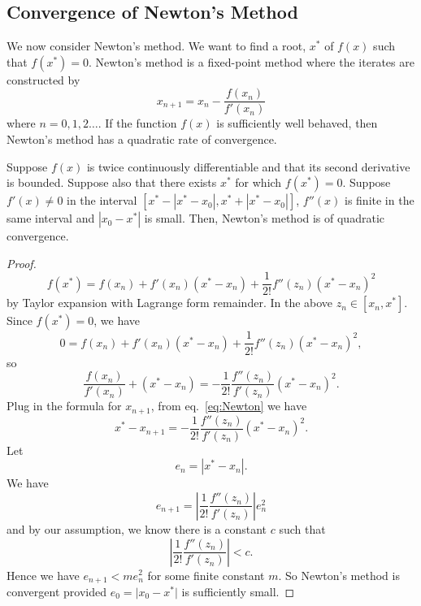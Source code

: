\subsection{Convergence of Newton's Method}

We now consider Newton's method. We want to find a root, $x^*$ of $f(x)$ such that $f(x^*)=0.$ Newton's method is a fixed-point method where the iterates are constructed by
\begin{equation}\label{eq:Newton}
x_{n+1}=x_{n}-\frac{f(x_{n})}{f'(x_{n})}
\end{equation}
where $n=0,1,2\ldots$. If the function $f(x)$ is sufficiently well behaved, then Newton's method has a quadratic rate of convergence. 

\begin{theorem}
Suppose $f(x)$ is twice continuously differentiable and that its second derivative is bounded. Suppose also that there exists $x^*$ for which $f(x^{*})=0$. Suppose $f'(x)\neq0$ in the interval $\left[x^{*}-\left|x^{*}-x_{0}\right|,x^{*}+\left|x^{*}-x_{0}\right|\right]$, $f''(x)$ is finite in the same interval and $\left\lvert x_{0} - x^{*}\right\rvert$ is small. Then, Newton's method is of quadratic convergence.
\end{theorem}

\begin{proof}
\begin{equation}
f(x^{*})=f(x_{n})+f'(x_{n})(x^{*}-x_{n})+\frac{1}{2!}f''(z_{n})(x^{*}-x_{n})^{2}
\end{equation}
by Taylor expansion with Lagrange form remainder. In the above $z_{n}\in[x_{n},x^{*}]$. Since $f(x^*)=0$, we have 
\begin{equation}
0=f(x_{n})+f'(x_{n})(x^{*}-x_{n})+\frac{1}{2!}f''(z_{n})(x^{*}-x_{n})^{2},
\end{equation}
so 
\begin{equation}
\frac{f(x_{n})}{f'(x_{n})}+(x^{*}-x_{n})=-\frac{1}{2!}\frac{f''(z_{n})}{f'(z_{n})}(x^{*}-x_{n})^{2}.
\end{equation}
Plug in the formula for $x_{n+1}$, from eq.\ \eqref{eq:Newton}  we have 
\begin{equation}
x^{*}-x_{n+1}=-\frac{1}{2!}\frac{f''(z_{n})}{f'(z_{n})}(x^{*}-x_{n})^{2}.
\end{equation}
Let
\begin{equation}
e_{n}=\left|x^{*}-x_{n}\right|.
\end{equation} 
We have 
\begin{equation}
e_{n+1}=\left|\frac{1}{2!}\frac{f''(z_{n})}{f'(z_{n})}\right|e_{n}^{2}
\end{equation}
and by our assumption, we know there is a constant $c$ such that
\begin{equation}
\left|\frac{1}{2!}\frac{f''(z_{n})}{f'(z_{n})}\right|<c.
\end{equation}
Hence we have $e_{n+1}<me_{n}^{2}$ for some finite constant $m$. So Newton's method is convergent provided $e_0=\lvert x_0-x^*\rvert$ is sufficiently small.
\end{proof}

